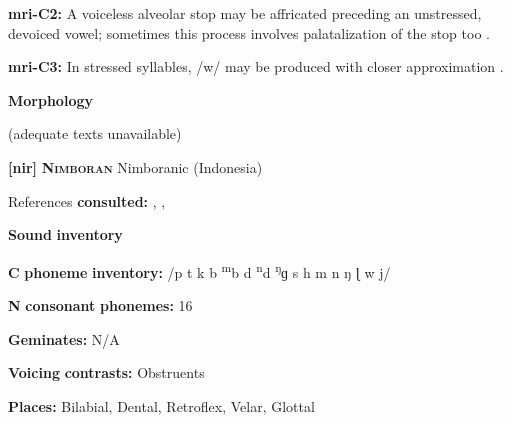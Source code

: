 \documentclass[output=paper]{langsci/langscibook}
\begin{document}
\begin{styleBody}
\textbf{mri-C2:} A voiceless alveolar stop may be affricated preceding an unstressed, devoiced vowel; sometimes this process involves palatalization of the stop too \citep{Bauer1999}.
\end{styleBody}

\begin{styleBody}
\textbf{mri-C3:} In stressed syllables, /w/ may be produced with closer approximation \citep[545]{Bauer1999}.
\end{styleBody}

\begin{styleBody}
\textbf{Morphology}
\end{styleBody}

\begin{styleBody}
(adequate texts unavailable)
\end{styleBody}

\begin{styleBody}
\textbf{[nir]}   \textbf{\textsc{Nimboran}}  Nimboranic (Indonesia)
\end{styleBody}

\begin{styleBody}
References \textbf{consulted:} \citet{Anceaux1965}, \citet{MayMay1981}, \citet{May1997}
\end{styleBody}

\begin{styleBody}
\textbf{Sound} \textbf{inventory}
\end{styleBody}

\begin{styleBody}
\textbf{C} \textbf{phoneme} \textbf{inventory:} /p t k b \textsuperscript{m}b d \textsuperscript{n}d \textsuperscript{ŋ}ɡ s h m n ŋ ɭ w j/
\end{styleBody}

\begin{styleBody}
\textbf{N} \textbf{consonant} \textbf{phonemes:} 16
\end{styleBody}

\begin{styleBody}
\textbf{Geminates:} N/A
\end{styleBody}

\begin{styleBody}
\textbf{Voicing} \textbf{contrasts:} Obstruents
\end{styleBody}

\begin{styleBody}
\textbf{Places:} Bilabial, Dental, Retroflex, Velar, Glottal
\end{styleBody}
\end{document}
